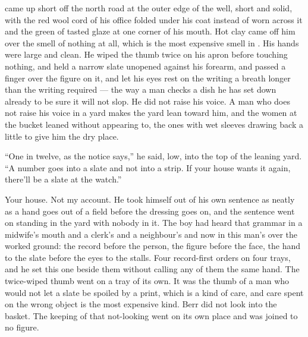  came up short off the north road at the outer edge of the well, short and solid, with the red wool cord of his office folded under his coat instead of worn across it and the green of tasted glaze at one corner of his mouth. Hot clay came off him over the smell of nothing at all, which is the most expensive smell in . His hands were large and clean. He wiped the thumb twice on his apron before touching nothing, and held a narrow slate unopened against his forearm, and passed a finger over the figure on it, and let his eyes rest on the writing a breath longer than the writing required --- the way a man checks a dish he has set down already to be sure it will not slop. He did not raise his voice. A man who does not raise his voice in a yard makes the yard lean toward him, and the women at the bucket leaned without appearing to, the ones with wet sleeves drawing back a little to give him the dry place.

“One in twelve, as the notice says,” he said, low, into the top of the leaning yard. “A number goes into a slate and not into a strip. If your house wants it again, there'll be a slate at the watch.”

Your house. Not my account. He took himself out of his own sentence as neatly as a hand goes out of a field before the dressing goes on, and the sentence went on standing in the yard with nobody in it. The boy had heard that grammar in a midwife's mouth and a clerk's and a neighbour's and now in this man's over the worked ground: the record before the person, the figure before the face, the hand to the slate before the eyes to the stalls. Four record-first orders on four trays, and he set this one beside them without calling any of them the same hand. The twice-wiped thumb went on a tray of its own. It was the thumb of a man who would not let a slate be spoiled by a print, which is a kind of care, and care spent on the wrong object is the most expensive kind. Berr did not look into the basket. The keeping of that not-looking went on its own place and was joined to no figure.

